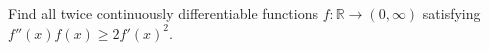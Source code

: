 Find all twice continuously differentiable functions \(f\colon  \mathbb{R} \to (0, \infty)\) satisfying \(f''(x)f(x) \ge 2f'(x)^2.\)